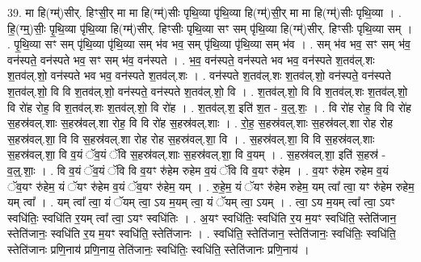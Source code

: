 \documentclass[17pt]{extarticle}
\begin{document}
39. मा हि(ग्म्॑)सीर्. हिꣳसी॒र् मा मा हि(ग्म्॑)सीः पृथि॒व्या पृ॑थि॒व्या हि(ग्म्॑)सी॒र् मा मा हि(ग्म्॑)सीः पृथि॒व्या । . हि॒(ग्म्॒)सीः॒ पृ॒थि॒व्या पृ॑थि॒व्या हि(ग्म्॑)सीर्. हिꣳसीः पृथि॒व्या सꣳ सम् पृ॑थि॒व्या हि(ग्म्॑)सीर्. हिꣳसीः पृथि॒व्या सम् । . पृ॒थि॒व्या सꣳ सम् पृ॑थि॒व्या पृ॑थि॒व्या सम् भ॑व भव॒ सम् पृ॑थि॒व्या पृ॑थि॒व्या सम् भ॑व । . सम् भ॑व भव॒ सꣳ सम् भ॑व॒ वन॑स्पते॒ वन॑स्पते भव॒ सꣳ सम् भ॑व॒ वन॑स्पते । . भ॒व॒ वन॑स्पते॒ वन॑स्पते भव भव॒ वन॑स्पते श॒तव॑ल्.शः श॒तव॑ल्.शो॒ वन॑स्पते भव भव॒ वन॑स्पते श॒तव॑ल्.शः । . वन॑स्पते श॒तव॑ल्.शः श॒तव॑ल्.शो॒ वन॑स्पते॒ वन॑स्पते श॒तव॑ल्.शो॒ वि वि श॒तव॑ल्.शो॒ वन॑स्पते॒ वन॑स्पते श॒तव॑ल्.शो॒ वि । . श॒तव॑ल्.शो॒ वि वि श॒तव॑ल्.शः श॒तव॑ल्.शो॒ वि रो॑ह रोह॒ वि श॒तव॑ल्.शः श॒तव॑ल्.शो॒ वि रो॑ह । . श॒तव॑ल्.श॒ इति॑ श॒त - व॒ल्॒.शः॒ । . वि रो॑ह रोह॒ वि वि रो॑ह स॒हस्र॑वल्.शाः स॒हस्र॑वल्.शा रोह॒ वि वि रो॑ह स॒हस्र॑वल्.शाः । . रो॒ह॒ स॒हस्र॑वल्.शाः स॒हस्र॑वल्.शा रोह रोह स॒हस्र॑वल्.शा॒ वि वि स॒हस्र॑वल्.शा रोह रोह स॒हस्र॑वल्.शा॒ वि । . स॒हस्र॑वल्.शा॒ वि वि स॒हस्र॑वल्.शाः स॒हस्र॑वल्.शा॒ वि व॒यं ॅव॒यं ॅवि स॒हस्र॑वल्.शाः स॒हस्र॑वल्.शा॒ वि व॒यम् । . स॒हस्र॑वल्.शा॒ इति॑ स॒हस्र॑ - व॒ल्॒.शाः॒ । . वि व॒यं ॅव॒यं ॅवि वि व॒यꣳ रु॑हेम रुहेम व॒यं ॅवि वि व॒यꣳ रु॑हेम । . व॒यꣳ रु॑हेम रुहेम व॒यं ॅव॒यꣳ रु॑हेम॒ यं ॅयꣳ रु॑हेम व॒यं ॅव॒यꣳ रु॑हेम॒ यम् । . रु॒हे॒म॒ यं ॅयꣳ रु॑हेम रुहेम॒ यम् त्वा᳚ त्वा॒ यꣳ रु॑हेम रुहेम॒ यम् त्वा᳚ । . यम् त्वा᳚ त्वा॒ यं ॅयम् त्वा॒ ऽय म॒यम् त्वा॒ यं ॅयम् त्वा॒ ऽयम् । . त्वा॒ ऽय म॒यम् त्वा᳚ त्वा॒ ऽयꣳ स्वधि॑तिः॒ स्वधि॑ति र॒यम् त्वा᳚ त्वा॒ ऽयꣳ स्वधि॑तिः । . अ॒यꣳ स्वधि॑तिः॒ स्वधि॑ति र॒य म॒यꣳ स्वधि॑ति॒ स्तेति॑जान॒ स्तेति॑जानः॒ स्वधि॑ति र॒य म॒यꣳ स्वधि॑ति॒ स्तेति॑जानः । . स्वधि॑ति॒ स्तेति॑जान॒ स्तेति॑जानः॒ स्वधि॑तिः॒ स्वधि॑ति॒ स्तेति॑जानः प्रणि॒नाय॑ प्रणि॒नाय॒ तेति॑जानः॒ स्वधि॑तिः॒ स्वधि॑ति॒ स्तेति॑जानः प्रणि॒नाय॑ । \newline
\end{document}
